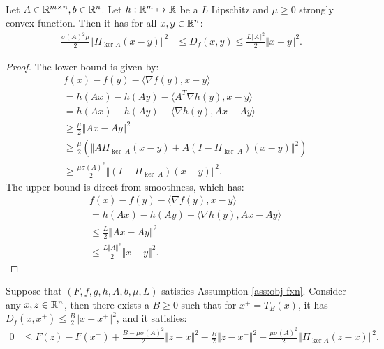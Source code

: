 \documentclass[12pt]{article}
\begin{document}
    \begin{lemma}\;\label{lemma:aff-scnvx-smooth-lin-comp}\\
        Let $A \in \mathbb R^{m \times n}, b \in \mathbb R^n$. 
        Let $h: \mathbb R^m \mapsto \mathbb R$ be a $L$ Lipschitz and $\mu \ge 0$ strongly convex function. 
        Then it has for all $x, y \in \mathbb R^n$: 
        \begin{align*}
            \frac{\sigma(A)^2\mu}{2}\Vert \Pi_{\ker A}(x - y)\Vert^2 
            &\le 
            D_f(x, y) 
            \le 
            \frac{L\Vert A\Vert^2}{2}\Vert x - y\Vert^2. 
        \end{align*}
    \end{lemma}
    \begin{proof}
        The lower bound is given by: 
        \begin{align*}
            & f(x) - f(y) - \langle \nabla f(y), x - y\rangle
            \\
            &=
            h(Ax) - h(Ay) - \langle A^T \nabla h(y), x - y\rangle
            \\
            &= h(Ax) - h(Ay) - \langle \nabla h(y), Ax - Ay\rangle
            \\
            &\ge \frac{\mu}{2}\Vert Ax - Ay\Vert^2
            \\
            &\ge 
            \frac{\mu}{2}
            \left(
                \Vert A\Pi_{\ker\; A}(x - y)
                + A(I - \Pi_{\ker\; A})(x - y) \Vert^2 
            \right)
            \\
            &\ge
            \frac{\mu\sigma(A)^2}{2}\Vert (I - \Pi_{\ker\; A})(x - y) \Vert^2. 
        \end{align*}
        The upper bound is direct from smoothness, which has: 
        \begin{align*}
            & f(x) - f(y) - \langle \nabla f(y), x - y\rangle
            \\
            &= h(Ax) - h(Ay) - \langle \nabla h(y), Ax - Ay\rangle
            \\
            &\le \frac{L}{2}\Vert Ax - Ay\Vert^2
            \\
            &\le \frac{L\Vert A\Vert^2}{2}\Vert x - y\Vert^2. 
        \end{align*}
    \end{proof}
    \begin{theorem}\label{thm:pg-ineq}
        Suppose that $(F, f, g, h, A, b, \mu, L)$ satisfies Assumption \ref{ass:obj-fxn}. 
        Consider any $x, z \in \mathbb R^n$, then there exists a $B \ge 0$ such that for $x^+ = T_B(x)$, it has $D_f(x, x^+) \le \frac{B}{2}\Vert x - x^+\Vert^2$, and it satisfies: 
        \begin{align*}
            0 &\le F(z) - F(x^+) + \frac{B - \mu\sigma(A)^2}{2}\Vert z - x\Vert^2 
            - \frac{B}{2}\Vert z - x^+\Vert^2
            + \frac{\mu\sigma(A)^2}{2}\Vert \Pi_{\ker A}(z - x)\Vert^2. 
        \end{align*}
    \end{theorem}
\end{document}
